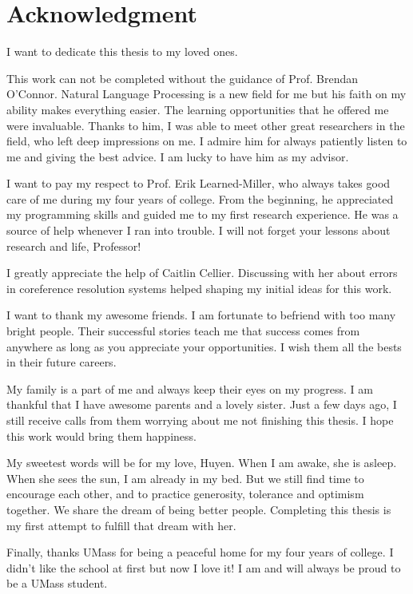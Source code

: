 \chapter{Acknowledgment}

I want to dedicate this thesis to my loved ones. 

This work can not be completed without the guidance of Prof. Brendan O'Connor. Natural Language Processing is a new field for me but his faith on my ability makes everything easier. The learning opportunities that he offered me were invaluable. Thanks to him, I was able to meet other great researchers in the field, who left deep impressions on me. I admire him for always patiently listen to me and giving the best advice. I am lucky to have him as my advisor. 

I want to pay my respect to Prof. Erik Learned-Miller, who always takes good care of me during my four years of college. From the beginning, he appreciated my programming skills and guided me to my first research experience. He was a source of help whenever I ran into trouble. I will not forget your lessons about research and life, Professor!

I greatly appreciate the help of Caitlin Cellier. Discussing with her about errors in coreference resolution systems helped shaping my initial ideas for this work. 

I want to thank my awesome friends. I am fortunate to befriend with too many bright people. Their successful stories teach me that success comes from anywhere as long as you appreciate your opportunities. I wish them all the bests in their future careers.

My family is a part of me and always keep their eyes on my progress. I am thankful that I have awesome parents and a lovely sister. Just a few days ago, I still receive calls from them worrying about me not finishing this thesis. I hope this work would bring them happiness.

My sweetest words will be for my love, Huyen. When I am awake, she is asleep. When she sees the sun, I am already in my bed. But we still find time to encourage each other, and to practice generosity, tolerance and optimism together. We share the dream of being better people. Completing this thesis is my first attempt to fulfill that dream with her.     

Finally, thanks UMass for being a peaceful home for my four years of college. I didn't like the school at first but now I love it! I am and will always be proud to be a UMass student. 






